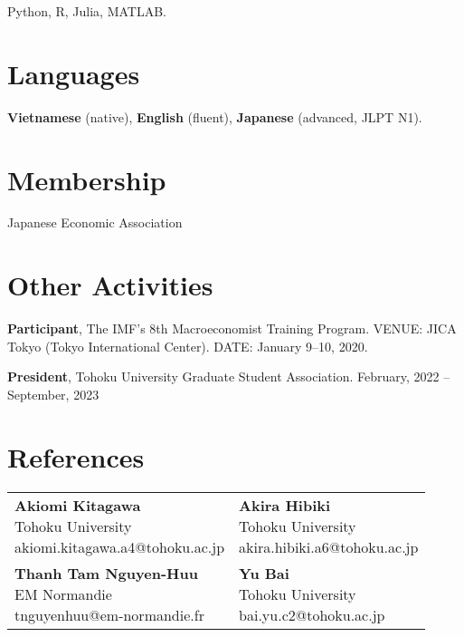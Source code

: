 \documentclass[12pt]{article}
\begin{document}
Python, R, Julia, MATLAB.

\section{Languages}

\textbf{Vietnamese} (native), \textbf{English} (fluent), \textbf{Japanese} (advanced, JLPT N1).

\section{Membership}

Japanese Economic Association

\section{Other Activities}

\textbf{Participant}, The IMF's 8th Macroeconomist Training Program. VENUE: JICA Tokyo (Tokyo International Center). DATE: January 9--10, 2020.

\textbf{President}, Tohoku University Graduate Student Association. February, 2022 -- September, 2023

\section{\sc References}

\begin{center}
    \begin{tabular}{p{7cm} p{7cm}}
        \parbox[t]{7cm}{
            {\bf Akiomi Kitagawa} \\ 
            Tohoku University \\
            akiomi.kitagawa.a4@tohoku.ac.jp
        } 
        
        & 
        
        \parbox[t]{7cm}{
        {\bf Akira Hibiki} \\ 
        Tohoku University \\
        akira.hibiki.a6@tohoku.ac.jp
        } 
        
        \\
        
        \vspace{1em}
        \parbox[t]{7cm}{
        {\bf Thanh Tam Nguyen-Huu} \\ 
        EM Normandie  \\
        tnguyenhuu@em-normandie.fr
        }
        
        &
        
        \vspace{1em}
        \parbox[t]{7cm}{
        {\bf Yu Bai} \\ 
        Tohoku University \\
        bai.yu.c2@tohoku.ac.jp
        }
    \end{tabular}
\end{center}
\end{document}
